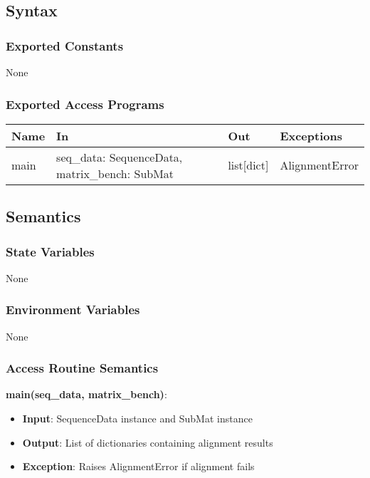 \documentclass[12pt, titlepage]{article}
\begin{document}
\subsection{Syntax}

\subsubsection{Exported Constants}

None

\subsubsection{Exported Access Programs}

\begin{center}
\begin{tabular}{p{4cm} p{4cm} p{3cm} p{2cm}}
\hline
\textbf{Name} & \textbf{In} & \textbf{Out} & \textbf{Exceptions} \\
\hline
main & seq\_data: SequenceData, matrix\_bench: SubMat & list[dict] & AlignmentError \\
\hline
\end{tabular}
\end{center}

\subsection{Semantics}

\subsubsection{State Variables}

None

\subsubsection{Environment Variables}

None


\subsubsection{Access Routine Semantics}

\noindent \textbf{main(seq\_data, matrix\_bench)}:
\begin{itemize}
    \item \textbf{Input}: SequenceData instance and SubMat instance
    \item \textbf{Output}: List of dictionaries containing alignment results
    \item \textbf{Exception}: Raises AlignmentError if alignment fails
\end{itemize}
\end{document}
